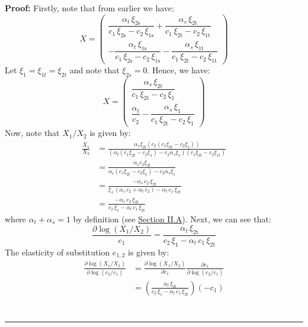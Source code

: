 \documentclass[11pt,a4paper]{extarticle}
\newenvironment{proof}[1][Proof]{\noindent\textbf{#1:} }{\ \rule{0.5em}{0.5em}}
\begin{document}
\begin{proof}
	Firstly, note that from earlier we have:
	$$
	X = \begin{pmatrix}
		\dfrac{\alpha _{t}\,\xi _{\mathrm{2s}}}{c_{1}\,\xi _{\mathrm{2s}}-c_{2}\,\xi _{\mathrm{1s}}}+\dfrac{\alpha _{s}\,\xi _{\mathrm{2t}}}{c_{1}\,\xi _{\mathrm{2t}}-c_{2}\,\xi _{\mathrm{1t}}} \\[2ex] 
		-\dfrac{\alpha _{t}\,\xi _{\mathrm{1s}}}{c_{1}\,\xi _{\mathrm{2s}}-c_{2}\,\xi _{\mathrm{1s}}}-\dfrac{\alpha _{s}\,\xi _{\mathrm{1t}}}{c_{1}\,\xi _{\mathrm{2t}}-c_{2}\,\xi _{\mathrm{1t}}}
	\end{pmatrix}
	$$
	Let $\xi_1 = \xi_{1t} = \xi_{2t}$ and note that $\xi_{2s} = 0$. Hence, we have:
	$$
	X = \begin{pmatrix}
	\dfrac{\alpha _{s}\,\xi _{\mathrm{2t}}}{c_{1}\,\xi _{\mathrm{2t}}-c_{2}\,\xi _{\mathrm{1}}} \\
	\dfrac{\alpha _{t}}{c_{2}}-\dfrac{\alpha _{s}\,\xi _{\mathrm{1}}}{c_{1}\,\xi _{\mathrm{2t}}-c_{2}\,\xi _{\mathrm{1}}}
	\end{pmatrix}
	$$
	Now, note that $X_1/X_2$ is given by:
	\begin{align*}
	\frac{X_1}{X_2} &= \frac{\alpha_s \xi_{2t} \left( c_2 ( c_1 \xi_{2t} - c_2 \xi_{1} ) \right)}{ \left( \alpha_t (c_1 \xi_{2t} - c_2 \xi_{1}) -  c_2 \alpha_s \xi_1 \right) (c_1 \xi_{2t} - c_2 \xi_{1t})}  \\
	&= \frac{\alpha_s c_2 \xi_{2t}}{ \alpha_t (c_1 \xi_{2t} - c_2 \xi_{1}) -  c_2 \alpha_s \xi_1 }\\
	&= \frac{-\alpha _{s}\,c_{2}\,\xi _{\mathrm{2t}}}{\xi _{1}\,\left(\alpha _{s}\,c_{2}+\alpha _{t}\,c_{2}\right)-\alpha _{t}\,c_{1}\,\xi _{\mathrm{2t}}} \\
	&= \frac{-\alpha _{s}\,c_{2}\,\xi _{\mathrm{2t}}}{c_2\,\xi_1-\alpha _{t}\,c_{1}\,\xi _{\mathrm{2t}}}
	\end{align*}
	where $\alpha_t + \alpha_s = 1$ by definition (see \hyperref[sec:consumers]{Section II.A}).  Next, we can see that:
	$$
	\frac{\partial \log(X_1/X_2)}{c_1} = \frac{\alpha _{t}\,\xi _{\mathrm{2t}}}{c_2\,\xi_1-\alpha _{t}\,c_{1}\,\xi _{\mathrm{2t}}}
	$$
	The elasticity of substitution $e_{1,2}$ is given by:
	\begin{align*}
	\frac{\partial \log(X_1/X_2)}{\partial \log(c_2/c_1)} &= \frac{\partial \log(X_1/X_2)}{\partial c_1}\frac{\partial c_1}{\partial \log(c_2/c_1)} \\
	&= \left( \frac{\alpha _{t}\,\xi _{\mathrm{2t}}}{c_2\,\xi_1-\alpha _{t}\,c_{1}\,\xi _{\mathrm{2t}}} \right) \left( -c_1 \right)  \\

\end{align*}
\end{proof}
\end{document}
